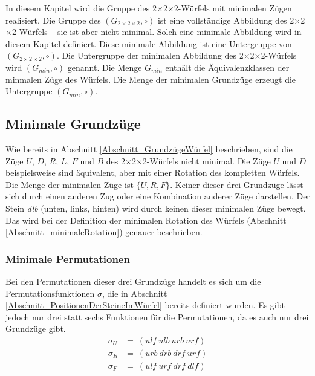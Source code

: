 \documentclass[12pt,a4paper, usenames, dvipsnames]{article}
\theoremstyle{mystyle}
\theoremstyle{definition}
\newcommand{\Gtwo}{\ensuremath{G_{2\times 2\times 2}}}
\newcommand{\Ttwo}{2$\times$2$\times$2-}
\begin{document}
In diesem Kapitel wird die Gruppe des \Ttwo Würfels mit minimalen Zügen realisiert. Die Gruppe des $(\Gtwo, \circ)$ ist eine vollständige Abbildung des \Ttwo Würfels -- sie ist aber nicht minimal. Solch eine minimale Abbildung wird in diesem Kapitel definiert. Diese minimale Abbildung ist eine Untergruppe von $(\Gtwo, \circ)$.
Die Untergruppe der minimalen Abbildung des \Ttwo Würfels wird $(G_{min}, \circ)$ genannt. Die Menge $G_{min}$ enthält die Äquivalenzklassen der minmalen Züge des Würfels.
Die Menge der minimalen Grundzüge erzeugt die Untergruppe $(G_{min}, \circ)$.

%
%
%
%
%
%
%
%
%
%
%
%
%
%
%
%
%
%
%
%
\subsection{Minimale Grundzüge}
\label{Abschnitt_MinimalePermutationen}
\label{Abschnitt_MinimaleGrundzüge}

Wie bereits in Abschnitt \ref{Abschnitt_GrundzügeWürfel} beschrieben, sind die Züge $U$, $D$, $R$, $L$, $F$ und $B$ des \Ttwo Würfels nicht minimal. Die Züge $U$ und $D$ beispielsweise sind äquivalent, aber mit einer Rotation des kompletten Würfels. 
Die Menge der minimalen Züge ist $\{ U, R, F\}$. Keiner dieser drei Grundzüge lässt sich durch einen anderen Zug oder eine Kombination anderer Züge darstellen. Der Stein \textit{dlb} (unten, links, hinten) wird durch keinen dieser minimalen Züge bewegt. Das wird bei der Definition der minimalen Rotation des Würfels (Abschnitt \ref{Abschnitt_minimaleRotation}) genauer beschrieben.

\subsubsection*{Minimale Permutationen}

Bei den Permutationen dieser drei Grundzüge handelt es sich um die Permutationsfunktionen $\sigma$, die in Abschnitt \ref{Abschnitt_PositionenDerSteineImWürfel} bereits definiert wurden. Es gibt jedoch nur drei statt sechs Funktionen für die Permutationen, da es auch nur drei Grundzüge gibt.
\begin{align*}
\sigma_U & =\ ( \textit{ulf} \ \textit{ulb} \ \textit{urb} \ \textit{urf} ) \\
\sigma_R & =\ ( \textit{urb} \ \textit{drb} \ \textit{drf} \ \textit{urf} ) \\
\sigma_F & =\ ( \textit{ulf} \ \textit{urf} \ \textit{drf} \ \textit{dlf} ) 
\end{align*}
\end{document}
